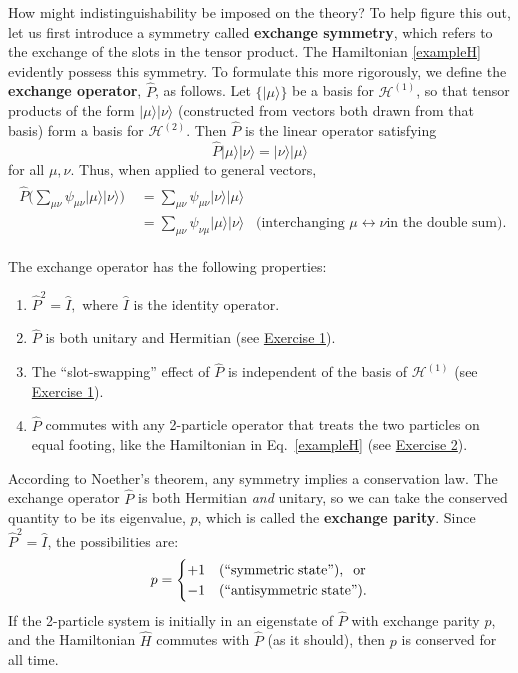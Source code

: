 \documentclass[prx,12pt]{revtex4-2}
\begin{document}
How might indistinguishability be imposed on the theory?  To help
figure this out, let us first introduce a symmetry called
\textbf{exchange symmetry}, which refers to the exchange of the slots
in the tensor product.  The Hamiltonian \eqref{exampleH} evidently
possess this symmetry.  To formulate this more rigorously, we define
the \textbf{exchange operator}, $\hat{P}$, as follows.  Let
$\{|\mu\rangle\}$ be a basis for $\mathscr{H}^{(1)}$, so that tensor
products of the form $|\mu\rangle |\nu\rangle$ (constructed from
vectors both drawn from that basis) form a basis for
$\mathscr{H}^{(2)}$.  Then $\hat{P}$ is the linear operator satisfying
\begin{equation}
  \hat{P} |\mu\rangle |\nu\rangle = |\nu\rangle|\mu\rangle
\end{equation}
for all $\mu, \nu$.  Thus, when applied to general vectors,
\begin{align}
  \begin{aligned}\hat{P} \Big (\sum_{\mu\nu}
    \psi_{\mu\nu} |\mu\rangle|\nu\rangle \Big)
    \;&=  \sum_{\mu\nu} \psi_{\mu\nu} |\nu\rangle|\mu\rangle \\
    &= \sum_{\mu\nu} \psi_{\nu\mu} |\mu\rangle|\nu\rangle
    \;\;\;\textrm{(interchanging $\mu\leftrightarrow \nu$
      in the double sum).}\end{aligned}
\end{align}

\noindent
The exchange operator has the following properties:
\begin{enumerate}
\item $\hat{P}^2 = \hat{I},$ where $\hat{I}$ is the identity operator.

\item $\hat{P}$ is both unitary and Hermitian (see
  \hyperref[ex:1]{Exercise 1}).
  
\item The ``slot-swapping'' effect of $\hat{P}$ is independent of the
  basis of $\mathscr{H}^{(1)}$ (see \hyperref[ex:1]{Exercise 1}).

\item $\hat{P}$ commutes with any 2-particle operator that treats the
  two particles on equal footing, like the Hamiltonian in
  Eq.~\eqref{exampleH} (see \hyperref[ex:2]{Exercise 2}).
\end{enumerate}

According to Noether's theorem, any symmetry implies a conservation
law.  The exchange operator $\hat{P}$ is both Hermitian \textit{and}
unitary, so we can take the conserved quantity to be its eigenvalue,
$p$, which is called the \textbf{exchange parity}.  Since $\hat{P}^2 =
\hat{I}$, the possibilities are:
\begin{equation}
  p = \begin{cases}+1 & \textrm{(``symmetric\;state'')}, \;\;\textrm{or} \\ -1 & \textrm{(``antisymmetric\;state'').}\end{cases}
\end{equation}
If the 2-particle system is initially in an eigenstate of $\hat{P}$
with exchange parity $p$, and the Hamiltonian $\hat{H}$ commutes with
$\hat{P}$ (as it should), then $p$ is conserved for all time.
\end{document}
